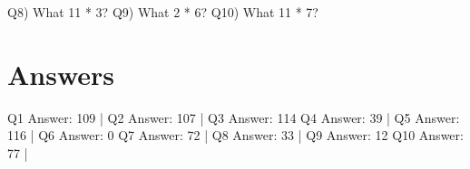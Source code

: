 \documentclass{article}%
\begin{document}
\newline%
\newline%
\newline%
\newline%
%
Q8)  What 11 * 3?%
\newline%
\newline%
\newline%
\newline%
\newline%
\newline%
\newline%
%
Q9)  What 2 * 6?%
\newline%
\newline%
\newline%
\newline%
\newline%
\newline%
\newline%
%
Q10)  What 11 * 7?%
\newline%
\newline%
\newline%
\newline%
\newline%
\newline%
\newline%

%

    \newpage
\section{Answers}%
\label{sec:Answers}%
Q1 Answer: 109   |   Q2 Answer: 107   |   Q3 Answer: 114\newline%
Q4 Answer: 39   |   Q5 Answer: 116   |   Q6 Answer: 0\newline%
Q7 Answer: 72   |   Q8 Answer: 33   |   Q9 Answer: 12\newline%
Q10 Answer: 77   |   

%
\end{document}
